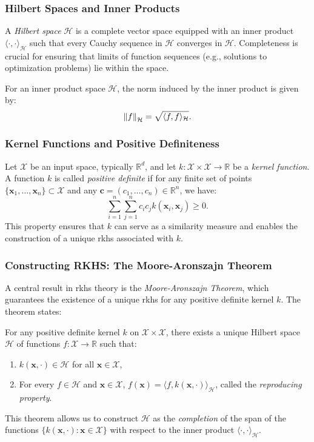 \subsubsection{Hilbert Spaces and Inner Products}

A \textit{Hilbert space} $\mathcal{H}$ is a complete vector space equipped with an inner product $\langle \cdot, \cdot \rangle_{\mathcal{H}}$ such that every Cauchy sequence in $\mathcal{H}$ converges in $\mathcal{H}$. Completeness is crucial for ensuring that limits of function sequences (e.g., solutions to optimization problems) lie within the space.

For an inner product space $\mathcal{H}$, the norm induced by the inner product is given by:
\[
\norm{f}_{\mathcal{H}} = \sqrt{\langle f, f \rangle_{\mathcal{H}}}.
\]

\subsubsection{Kernel Functions and Positive Definiteness}

Let $\mathcal{X}$ be an input space, typically $\mathbb{R}^d$, and let $k: \mathcal{X} \times \mathcal{X} \to \mathbb{R}$ be a \textit{kernel function}. A function $k$ is called \textit{positive definite} if for any finite set of points $\{\mathbf{x}_1, \dots, \mathbf{x}_n\} \subset \mathcal{X}$ and any $\mathbf{c} = (c_1, \dots, c_n) \in \mathbb{R}^n$, we have:
\[
\sum_{i=1}^n \sum_{j=1}^n c_i c_j k(\mathbf{x}_i, \mathbf{x}_j) \geq 0.
\]
This property ensures that $k$ can serve as a similarity measure and enables the construction of a unique \ac{rkhs} associated with $k$.

\subsubsection{Constructing RKHS: The Moore-Aronszajn Theorem}

A central result in \ac{rkhs} theory is the \textit{Moore-Aronszajn Theorem}, which guarantees the existence of a unique \ac{rkhs} for any positive definite kernel $k$. The theorem states:

\begin{theorem}
For any positive definite kernel $k$ on $\mathcal{X} \times \mathcal{X}$, there exists a unique Hilbert space $\mathcal{H}$ of functions $f: \mathcal{X} \to \mathbb{R}$ such that:
\begin{enumerate}
    \item $k(\mathbf{x}, \cdot) \in \mathcal{H}$ for all $\mathbf{x} \in \mathcal{X}$,
    \item For every $f \in \mathcal{H}$ and $\mathbf{x} \in \mathcal{X}$, $f(\mathbf{x}) = \langle f, k(\mathbf{x}, \cdot) \rangle_{\mathcal{H}}$, called the \textit{reproducing property}.
\end{enumerate}
\end{theorem}
This theorem allows us to construct $\mathcal{H}$ as the \textit{completion} of the span of the functions $\{k(\mathbf{x}, \cdot) : \mathbf{x} \in \mathcal{X}\}$ with respect to the inner product $\langle \cdot, \cdot \rangle_{\mathcal{H}}$.


